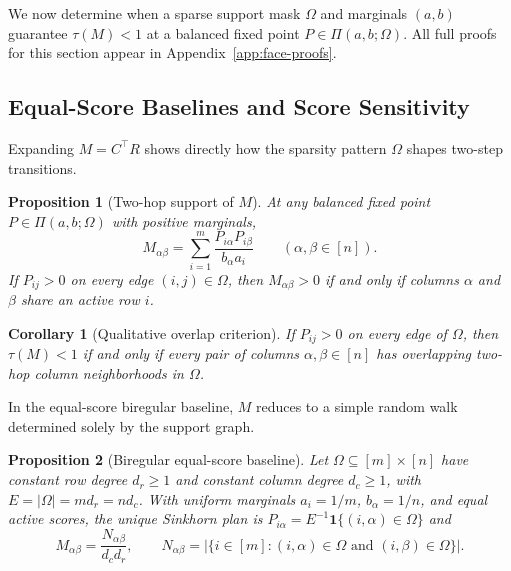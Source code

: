 \documentclass[10pt]{article}
\newtheorem{proposition}{Proposition}
\newtheorem{corollary}{Corollary}
\newcommand{\one}{\mathbf{1}}
\begin{document}
We now determine when a sparse support mask $\Omega$ and marginals $(a,b)$ guarantee $\tau(M) < 1$ at a balanced fixed point $P \in \Pi(a,b;\Omega)$. All full proofs for this section appear in Appendix~\ref{app:face-proofs}.

\subsection{Equal-Score Baselines and Score Sensitivity}

Expanding $M = C^\top R$ shows directly how the sparsity pattern $\Omega$ shapes two-step transitions.

\begin{proposition}[Two-hop support of $M$]
\label{prop:two-hop-support}
At any balanced fixed point $P \in \Pi(a,b;\Omega)$ with positive marginals,
\begin{equation}
\label{eq:kernel-entrywise}
  M_{\alpha\beta} = \sum_{i=1}^m \frac{P_{i\alpha} P_{i\beta}}{b_\alpha a_i}
  \qquad (\alpha,\beta \in [n]).
\end{equation}
If $P_{ij} > 0$ on every edge $(i,j)\in\Omega$, then $M_{\alpha\beta} > 0$ if and only if columns $\alpha$ and $\beta$ share an active row $i$.
\end{proposition}

\begin{corollary}[Qualitative overlap criterion]
\label{cor:overlap-criterion}
If $P_{ij} > 0$ on every edge of $\Omega$, then $\tau(M) < 1$ if and only if every pair of columns $\alpha,\beta \in [n]$ has overlapping two-hop column neighborhoods in $\Omega$.
\end{corollary}

In the equal-score biregular baseline, $M$ reduces to a simple random walk determined solely by the support graph.

\begin{proposition}[Biregular equal-score baseline]
\label{prop:biregular-baseline}
Let $\Omega \subseteq [m]\times[n]$ have constant row degree $d_r \ge 1$ and constant column degree $d_c \ge 1$, with $E = |\Omega| = md_r = nd_c$. With uniform marginals $a_i = 1/m$, $b_\alpha = 1/n$, and equal active scores, the unique Sinkhorn plan is $P_{i\alpha} = E^{-1}\one\{(i,\alpha)\in\Omega\}$ and
\begin{equation}
\label{eq:biregular-kernel}
  M_{\alpha\beta} = \frac{N_{\alpha\beta}}{d_c d_r},
  \qquad
  N_{\alpha\beta} = \bigl|\{i \in [m] : (i,\alpha)\in\Omega \text{ and } (i,\beta)\in\Omega\}\bigr|.
\end{equation}
\end{proposition}
\end{document}
